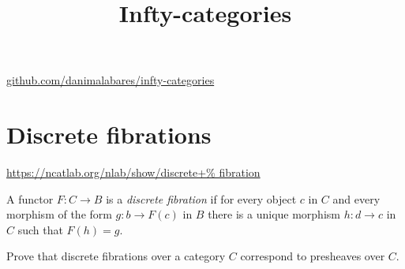 



\title{Infty-categories}
\maketitle

\label{section-phantom}
\hfill
\href{http://github.com/danimalabares/infty-%
categories}
{github.com/danimalabares/infty-categories}

\tableofcontents

\section{Discrete fibrations}
\label{section-discrete-fibrations}

\begin{definition}
\label{definition-discrete-fibration}
\begin{reference}
\url{https://ncatlab.org/nlab/show/discrete+%
fibration}
\end{reference}
A functor $F:C \to B$ is a {\it discrete
fibration} if for every object
$c$ in $C$ and every morphism of the form $g:
b \to F(c)$ in $B$
there is a unique morphism $h:d \to c$ in $C$
such that $F(h)=g$.
\end{definition}

\begin{exercise}
\label{exercise-discr-fibra-presh}
Prove that discrete fibrations over a
category $C$ correspond to presheaves over
$C$.
\end{exercise}

